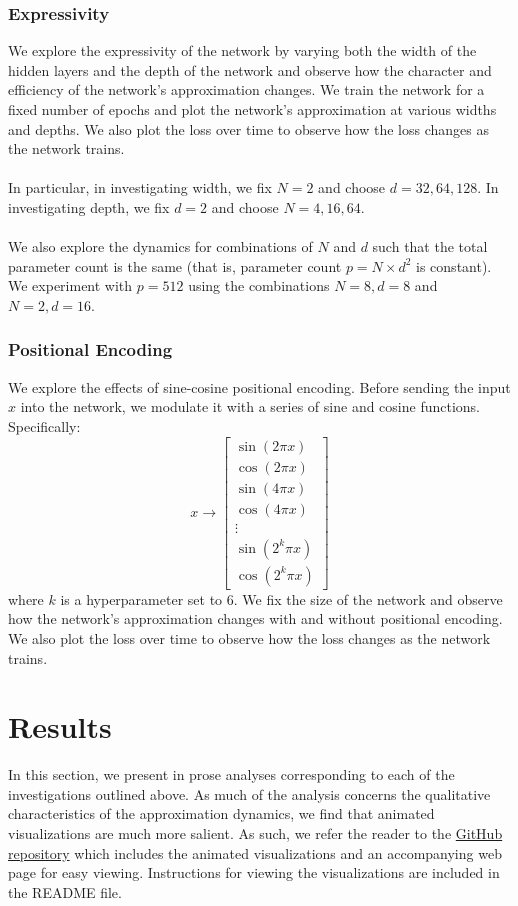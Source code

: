 \documentclass[11pt]{article}
\begin{document}
\subsubsection{Expressivity}
We explore the expressivity of the network by varying both the width of the hidden layers and the depth of the network and observe how the character and efficiency of the network's approximation changes. We train the network for a fixed number of epochs and plot the network's approximation at various widths and depths. We also plot the loss over time to observe how the loss changes as the network trains.
\\\\
In particular, in investigating width, we fix $N = 2$ and choose $d = 32, 64, 128$. In investigating depth, we fix $d = 2$ and choose $N = 4, 16, 64$.
\\\\
We also explore the dynamics for combinations of $N$ and $d$ such that the total parameter count is the same (that is, parameter count $p = N \times d^2$ is constant). We experiment with $p = 512$ using the combinations $N = 8, d = 8$ and $N = 2, d = 16$.

\subsubsection{Positional Encoding}
We explore the effects of sine-cosine positional encoding. Before sending the input $x$ into the network, we modulate it with a series of sine and cosine functions. Specifically:
\begin{equation}
    x \rightarrow \left[ \begin{array}{c} \sin(2\pi x) \\ \cos(2\pi x) \\ \sin(4\pi x) \\ \cos(4\pi x) \\ \vdots \\ \sin(2^k \pi x) \\ \cos(2^k \pi x) \end{array} \right]
\end{equation}
where $k$ is a hyperparameter set to 6. We fix the size of the network and observe how the network's approximation changes with and without positional encoding. We also plot the loss over time to observe how the loss changes as the network trains.

\section{Results}
In this section, we present in prose analyses corresponding to each of the investigations outlined above. As much of the analysis concerns the qualitative characteristics of the approximation dynamics, we find that animated visualizations are much more salient. As such, we refer the reader to the \href{https://github.com/dylanhu7/apma1941d/tree/main/expressivity}{GitHub repository} which includes the animated visualizations and an accompanying web page for easy viewing. Instructions for viewing the visualizations are included in the README file.
\end{document}
